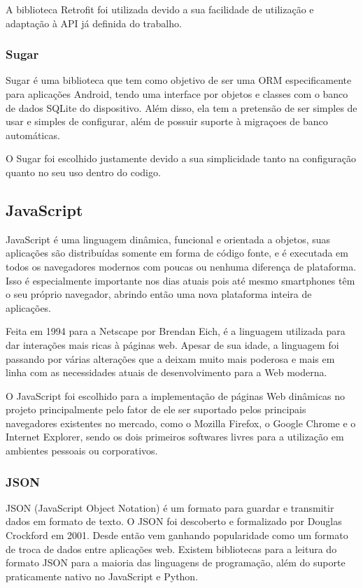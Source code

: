 \documentclass[
	article,			%
	11pt,				%
	oneside,			%
	a4paper,			%
	english,			%
	brazil,				%
	sumario=tradicional
	]{abntex2}
\begin{document}
A biblioteca Retrofit foi utilizada devido a sua facilidade de utilização e adaptação à API já definida do trabalho.

\subsubsection{Sugar}

Sugar é uma biblioteca que tem como objetivo de ser uma ORM especificamente para aplicações Android, tendo uma interface por objetos e classes com o banco de dados SQLite do dispositivo.
Além disso, ela tem a pretensão de ser simples de usar e simples de configurar, além de possuir suporte à migraçoes de banco automáticas.\cite{sugar}

O Sugar foi escolhido justamente devido a sua simplicidade tanto na configuração quanto no seu uso dentro do codigo.

\subsection{JavaScript}

JavaScript é uma linguagem dinâmica, funcional e orientada a objetos, suas aplicações são distribuídas somente em forma de código fonte, e é executada em todos os navegadores modernos com poucas ou nenhuma diferença de plataforma.
Isso é especialmente importante nos dias atuais pois até mesmo smartphones têm o seu próprio navegador, abrindo então uma nova plataforma inteira de aplicações.

Feita em 1994 para a Netscape por Brendan Eich, é a linguagem utilizada para dar interações mais ricas à páginas web.
Apesar de sua idade, a linguagem foi passando por várias alterações que a deixam muito mais poderosa e mais em linha com as necessidades atuais de desenvolvimento para a Web moderna.

O JavaScript foi escolhido para a implementação de páginas Web dinâmicas no projeto principalmente pelo fator de ele ser suportado pelos principais navegadores existentes no mercado, como o Mozilla Firefox, o Google Chrome e o Internet Explorer, sendo os dois primeiros softwares livres para a utilização em ambientes pessoais ou corporativos.

\subsubsection{JSON}

JSON (JavaScript Object Notation) é um formato para guardar e transmitir dados em formato de texto.
O JSON foi descoberto e formalizado por Douglas Crockford em 2001. \cite{json}
Desde então vem ganhando popularidade como um formato de troca de dados entre aplicações web.
Existem bibliotecas para a leitura do formato JSON para a maioria das linguagens de programação, além do suporte praticamente nativo no JavaScript e Python.
\end{document}
